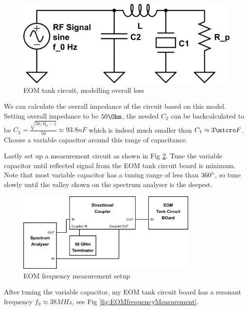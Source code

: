 \documentclass[11pt,A4Paper]{article}
\begin{document}
\begin{figure}[H]
    \centering
    \includegraphics[width=.8\textwidth]{eom-tank-cirucuit2.png}
    \caption{EOM tank circuit, modelling overall loss}
    \label{fig:eom-tank-cirucuit2}
\end{figure}

We can calculate the overall impedance of the circuit based on this model. Setting overall impedance to be $50\Ohm$, the needed $C_2$ can be backcalculated to be $C_2 = \frac{\sqrt{50/R_p -1}}{50} \approx 93.8 nF$ which is indeed much smaller than $C_1 \approx 3 \micro F$. Choose a variable capacitor around this range of capacitance. 
\par
Lastly set up a measurement circuit as shown in Fig \ref{fig:eom-freq-measurement-setup.png}. Tune the variable capacitor until reflected signal from the EOM tank circuit board is minimum. Note that most variable capacitor has a tuning range of less than $360\degree$, so tune slowly until the valley shown on the spectrum analyser is the deepest. 

\begin{figure}[H]
    \centering
    \includegraphics[width=0.8\textwidth]{eom-freq-measurement-setup.png}
    \caption{EOM frequency measurement setup}
    \label{fig:eom-freq-measurement-setup.png}
\end{figure}

After tuning the variable capacitor, my EOM tank circuit board has a resonant frequency $f_0 \approx 38 MHz$, see Fig \ref{fig:EOMfrequencyMeasurement}. 
\end{document}
